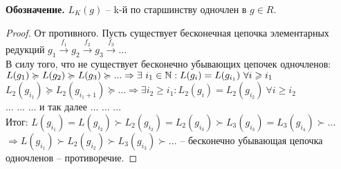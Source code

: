 \textbf{Обозначение.} $L_K(g)$ -- k-й по старшинству одночлен в $g\in R$.\\
\begin{proof}
    От противного. Пусть существует бесконечная цепочка элементарных редукций $g_1\overset{f_1}{\rightarrow}g_2\overset{f_2}{\rightarrow}g_3\overset{f_3}{\rightarrow}...$\\
    В силу того, что не существует бесконечно убывающих цепочек одночленов:\\
    $L(g_1)\succcurlyeq L(g_2)\succcurlyeq L(g_3)\succcurlyeq ...\Rightarrow \exists \ i_1\in \mathbb{N} : L(g_i)= L(g_{i_1})\ \forall i\geqslant i_1$\\
    $L_2(g_{i_1})\succcurlyeq L_2(g_{i_1+1})\succcurlyeq...\Rightarrow \exists i_2\geqslant i_1: L_2(g_i)=L_2(g_{i_2})\ \forall i\geqslant i_2$\\
    ... ... ... и так далее ... ... ...\\
    Итог: $L(g_{i_1})=L(g_{i_2})\succ L_2(g_{i_2})=L_2(g_{i_3})\succ L_3(g_{i_3})=L_3(g_{i_4})\succ...$\\
    $\Rightarrow L(g_{i_1})\succ L_2(g_{i_2})\succ L_3(g_{i_3})\succ...$ -- бесконечно убывающая цепочка одночленов -- противоречие.
\end{proof}
